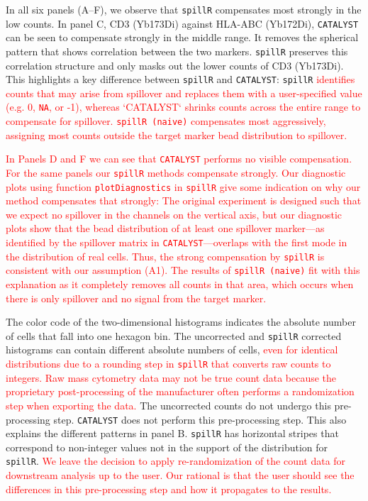 \documentclass[
]{article}
\begin{document}
In all six panels (A--F), we observe that \texttt{spillR} compensates most strongly in the low counts. In panel C, CD3 (Yb173Di) against HLA-ABC (Yb172Di), \texttt{CATALYST} can be seen to compensate strongly in the middle range. It removes the spherical pattern that shows correlation between the two markers. \texttt{spillR} preserves this correlation structure and only masks out the lower counts of CD3 (Yb173Di). This highlights a key difference between \texttt{spillR} and \texttt{CATALYST}: \texttt{spillR} \textcolor{red}{identifies counts that may arise from spillover and replaces them with a user-specified value (e.g. 0, \texttt{NA}, or -1), whereas `CATALYST` shrinks counts across the entire range to compensate for spillover.}
\textcolor{red}{
\texttt{spillR (naive)} compensates most aggressively, assigning most counts outside the target marker bead distribution to spillover.}

\textcolor{red}{
In Panels D and F we can see that \texttt{CATALYST} performs no visible compensation. For the same panels our \texttt{spillR} methods compensate strongly. Our diagnostic plots using function \texttt{plotDiagnostics} in \texttt{spillR} give some indication on why our method compensates that strongly: The original experiment is designed such that we expect no spillover in the channels on the vertical axis, but our diagnostic plots show that the bead distribution of at least one spillover marker---as identified by the spillover matrix in \texttt{CATALYST}---overlaps with the first mode in the distribution of real cells. Thus, the strong compensation by \texttt{spillR} is consistent with our assumption (A1). The results of \texttt{spillR (naive)} fit with this explanation as it completely removes all counts in that area, which occurs when there is only spillover and no signal from the target marker.
}

The color code of the two-dimensional histograms indicates the absolute number of cells that fall into one hexagon bin. The uncorrected and \texttt{spillR} corrected histograms can contain different absolute numbers of cells,
\textcolor{red}{
even for identical distributions due to a rounding step in \texttt{spillR} that converts raw counts to integers. Raw mass cytometry data may not be true count data because the proprietary post-processing of the manufacturer often performs a randomization step when exporting the data.
}
The uncorrected counts do not undergo this pre-processing step. \texttt{CATALYST} does not perform this pre-processing step. This also explains the different patterns in panel B. \texttt{spillR} has horizontal stripes that correspond to non-integer values not in the support of the distribution for \texttt{spillR}.
\textcolor{red}{
We leave the decision to apply re-randomization of the count data for downstream analysis up to the user. Our rational is that the user should see the differences in this pre-processing step and how it propagates to the results.
}
\end{document}
